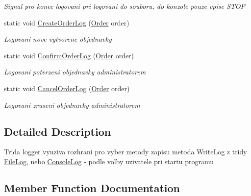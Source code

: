 \begin{DoxyCompactItemize}
\begin{DoxyCompactList}\small\item\em Signal pro konec logovani pri logovani do souboru, do konzole pouze vpise S\+T\+OP \end{DoxyCompactList}\item 
static void \mbox{\hyperlink{class_eshop_1_1_logger_a49f136196c9a633c3e09ab8a04e0474e}{Create\+Order\+Log}} (\mbox{\hyperlink{class_eshop_1_1_order}{Order}} order)
\begin{DoxyCompactList}\small\item\em Logovani nove vytvorene objednavky \end{DoxyCompactList}\item 
static void \mbox{\hyperlink{class_eshop_1_1_logger_a9af64dcef86bc9f5c7ebe8a21b483c5d}{Confirm\+Order\+Log}} (\mbox{\hyperlink{class_eshop_1_1_order}{Order}} order)
\begin{DoxyCompactList}\small\item\em Logovani potvrzeni objednavky administratorem \end{DoxyCompactList}\item 
static void \mbox{\hyperlink{class_eshop_1_1_logger_af7c31a36c0e69f14491395d1698fb026}{Cancel\+Order\+Log}} (\mbox{\hyperlink{class_eshop_1_1_order}{Order}} order)
\begin{DoxyCompactList}\small\item\em Logovani zruseni objednavky administratorem \end{DoxyCompactList}\end{DoxyCompactItemize}


\subsection{Detailed Description}
Trida logger vyuziva rozhrani pro vyber metody zapisu metoda Write\+Log z tridy \mbox{\hyperlink{class_eshop_1_1_file_log}{File\+Log}}, nebo \mbox{\hyperlink{class_eshop_1_1_console_log}{Console\+Log}} -\/ podle volby uzivatele pri startu programu 



\subsection{Member Function Documentation}
\mbox{\label{class_eshop_1_1_logger_af7c31a36c0e69f14491395d1698fb026}} 
